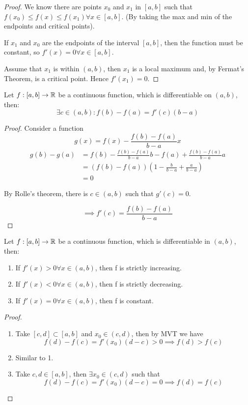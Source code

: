 \documentclass[a4paper,10pt]{article}
\begin{document}
\begin{proof}
	We know there are points $x_0$ and $x_1$ in $[a,b]$ such that
	$f(x_0) \leq f(x) \leq f(x_1) \forall x \in [a,b]$. (By taking
	the max and min of the endpoints and critical points).

	If $x_1$ and $x_0$ are the endpoints of the interval $[a,b]$,
	then the function must be constant, so $f'(x) = 0 \forall x \in
	[a,b]$.

	Assume that $x_1$ is within $(a,b)$, then $x_1$ is a local
	maximum and, by Fermat's Theorem, is a critical point. Hence
	$f'(x_1) = 0$.
\end{proof}

\begin{thm}
	Let $f:[a,b] \to \mathbb{R}$ be a continuous function, which is
	differentiable on $(a,b)$, then:
	\[ \exists c \in (a,b) : f(b) - f(a) = f'(c)(b-a) \]
\end{thm}

\begin{proof}
	Consider a function
	\[ g(x) = f(x) - \frac{f(b) - f(a)}{b-a}x \]
	\begin{align*}
		g(b) - g(a) &= f(b) - \frac{f(b) - f(a)}{b-a}b
		- f(a) + \frac{f(b) - f(a)}{b-a}a \\
		&= \left( f(b) - f(a) \right)
		\left(1 - \frac{b}{b-a} + \frac{a}{b-a} \right) \\
		&= 0
	\end{align*}

	By Rolle's theorem, there is $c \in (a,b)$ such that $g'(c) = 0$.

	\[ \implies f'(c) = \frac{f(b) - f(a)}{b-a} \]
\end{proof}

\begin{cor}
	Let $f:[a,b] \to \mathbb{R}$ be a continuous function, which is differentiable in $(a,b)$, then:
	\begin{enumerate}
		\item If $f'(x) > 0 \forall x \in (a,b)$, then f is strictly increasing.
		\item If $f'(x) < 0 \forall x \in (a,b)$, then f is strictly decreasing.
		\item If $f'(x) = 0 \forall x \in (a,b)$, then f is constant.
	\end{enumerate}
\end{cor}

\begin{proof}
	\begin{enumerate}
		\item Take $[c,d] \subset [a,b]$ and $x_0 \in (c,d)$, then by MVT we have
			\[ f(d) - f(c) = f'(x_0)(d-c) > 0 \implies f(d) > f(c) \]
		\item Similar to 1.
		\item Take $c,d \in [a,b]$, then $\exists x_0 \in (c,d)$ such that
			\[ f(d) - f(c) = f'(x_0)(d-c) = 0 \implies f(d) = f(c) \]
	\end{enumerate}
\end{proof}
\end{document}
